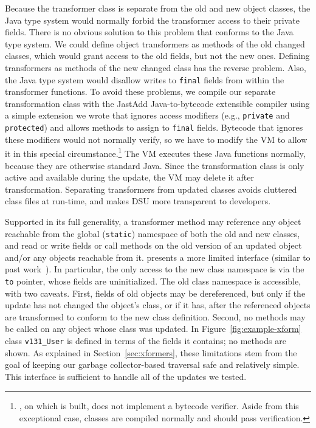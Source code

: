 Because the
transformer class is separate from the old and new object classes, the
Java type system would normally forbid the transformer access to their private
fields.  There is no obvious solution to this problem that conforms to
the Java type system. We could define object transformers as
methods of the old changed classes, which would grant access
to the old fields, but not the new ones.  Defining transformers as methods of the
new changed class has the reverse problem. Also, the Java type system
would disallow writes to {\tt final} fields from within the transformer
functions.
To avoid these problems, we
compile our separate transformation class with the JastAdd 
Java-to-bytecode extensible compiler \cite{JastAddJ} using a simple
extension we wrote that ignores access modifiers (e.g., {\tt private} and
{\tt protected}) and
allows methods to assign to {\tt final} fields.  
Bytecode that ignores these modifiers would not normally verify, so we
have to modify the VM to allow it in this special
circumstance.\footnote{\JikesRVM, on which \DSU{} is built, does not
  implement a bytecode verifier.  Aside from this exceptional case,
  \DSU{} classes are compiled normally and should
  pass verification.} The VM executes these 
Java functions normally, because they are otherwise standard Java. 
Since the transformation class is only active and available during the
update, the VM may delete it after transformation.  Separating
transformers from updated classes avoids cluttered class files
at run-time, and makes DSU more transparent to developers.

Supported in its full generality, a transformer method may
reference any object reachable from the global ({\tt static})
namespace of both the old and new classes, and read or write fields or
call methods on the old version of an updated object and/or any
objects reachable from it.  \DSU{} presents a more limited interface
(similar to past work~\cite{ritzau00dynamic,Mala00a}).
In particular, the only access to the new class namespace is via the
{\tt to} pointer, whose fields are uninitialized. The old class
namespace is accessible, 
with two caveats.  First, fields of old objects may be dereferenced,
but only if the update has not changed the object's class, or if it has, after
the referenced objects are transformed to conform to the new class
definition.  Second, no methods may be called on any object whose
class was updated.  In Figure~\ref{fig:example-xform}
class {\tt v131\_User} is defined in terms of the fields it
contains; no methods are shown.  As explained in
Section~\ref{sec:xformers}, these limitations stem from the goal of keeping
our garbage collector-based traversal safe and relatively simple.
This interface is sufficient to handle all of the updates we tested.

